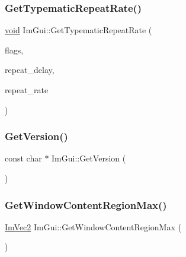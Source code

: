 \mbox{\label{namespaceImGui_a1cc0e048762c17bef27b0f403708cc0b}} 
\subsubsection{\texorpdfstring{Get\+Typematic\+Repeat\+Rate()}{GetTypematicRepeatRate()}}
{\footnotesize\ttfamily \hyperlink{imgui__impl__opengl3__loader_8h_ac668e7cffd9e2e9cfee428b9b2f34fa7}{void} Im\+Gui\+::\+Get\+Typematic\+Repeat\+Rate (\begin{DoxyParamCaption}\item[{\hyperlink{imgui__internal_8h_aa4211ddd58ae8523981eb953a1caf4b7}{Im\+Gui\+Input\+Flags}}]{flags,  }\item[{float $\ast$}]{repeat\+\_\+delay,  }\item[{float $\ast$}]{repeat\+\_\+rate }\end{DoxyParamCaption})}

\mbox{\label{namespaceImGui_a6488c3cfa6331c8a1e93769e580ce020}} 
\subsubsection{\texorpdfstring{Get\+Version()}{GetVersion()}}
{\footnotesize\ttfamily const char $\ast$ Im\+Gui\+::\+Get\+Version (\begin{DoxyParamCaption}{ }\end{DoxyParamCaption})}

\mbox{\label{namespaceImGui_a96ce6060592d3ef975594357e650adc6}} 
\subsubsection{\texorpdfstring{Get\+Window\+Content\+Region\+Max()}{GetWindowContentRegionMax()}}
{\footnotesize\ttfamily \hyperlink{structImVec2}{Im\+Vec2} Im\+Gui\+::\+Get\+Window\+Content\+Region\+Max (\begin{DoxyParamCaption}{ }\end{DoxyParamCaption})}

